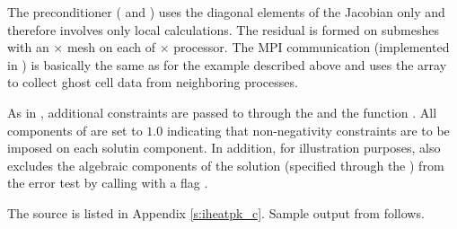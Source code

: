 The preconditioner ( and ) uses the diagonal 
elements of the Jacobian only and therefore involves only local calculations. 
The residual is formed on submeshes with an  $\times$  mesh 
on each of  $\times$  processor. 
The MPI communication (implemented in ) is basically the same
as for the  example described above and uses the  array
to collect ghost cell data from neighboring processes.

As in , additional constraints are passed to {\ida} through
the   and the function .
All components of  are set to $1.0$ indicating that non-negativity
constraints are to be imposed on each solutin component.
In addition, for illustration purposes,  also excludes the algebraic 
components of the solution (specified through the  ) from the 
error test by calling  with a flag .

The source is listed in Appendix \ref{s:iheatpk_c}.
Sample output from  follows.
\vspace{0.1in}

